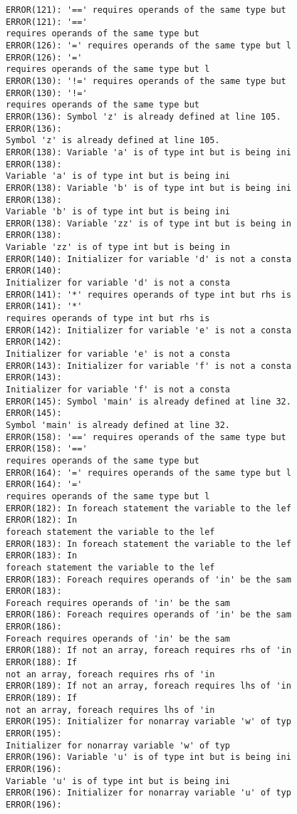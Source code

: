 \documentclass[12pt]{book}
\begin{document}
\begin{lstlisting}
ERROR(121): '==' requires operands of the same type but     ERROR(121): '=='
requires operands of the same type but 
ERROR(126): '=' requires operands of the same type but l    ERROR(126): '=' 
requires operands of the same type but l
ERROR(130): '!=' requires operands of the same type but     ERROR(130): '!='
requires operands of the same type but 
ERROR(136): Symbol 'z' is already defined at line 105.        ERROR(136): 
Symbol 'z' is already defined at line 105.
ERROR(138): Variable 'a' is of type int but is being ini    ERROR(138): 
Variable 'a' is of type int but is being ini
ERROR(138): Variable 'b' is of type int but is being ini    ERROR(138): 
Variable 'b' is of type int but is being ini
ERROR(138): Variable 'zz' is of type int but is being in    ERROR(138): 
Variable 'zz' is of type int but is being in
ERROR(140): Initializer for variable 'd' is not a consta    ERROR(140): 
Initializer for variable 'd' is not a consta
ERROR(141): '*' requires operands of type int but rhs is    ERROR(141): '*' 
requires operands of type int but rhs is
ERROR(142): Initializer for variable 'e' is not a consta    ERROR(142): 
Initializer for variable 'e' is not a consta
ERROR(143): Initializer for variable 'f' is not a consta    ERROR(143): 
Initializer for variable 'f' is not a consta
ERROR(145): Symbol 'main' is already defined at line 32.    ERROR(145): 
Symbol 'main' is already defined at line 32.
ERROR(158): '==' requires operands of the same type but     ERROR(158): '=='
requires operands of the same type but 
ERROR(164): '=' requires operands of the same type but l    ERROR(164): '=' 
requires operands of the same type but l
ERROR(182): In foreach statement the variable to the lef    ERROR(182): In 
foreach statement the variable to the lef
ERROR(183): In foreach statement the variable to the lef    ERROR(183): In 
foreach statement the variable to the lef
ERROR(183): Foreach requires operands of 'in' be the sam    ERROR(183): 
Foreach requires operands of 'in' be the sam
ERROR(186): Foreach requires operands of 'in' be the sam    ERROR(186): 
Foreach requires operands of 'in' be the sam
ERROR(188): If not an array, foreach requires rhs of 'in    ERROR(188): If 
not an array, foreach requires rhs of 'in
ERROR(189): If not an array, foreach requires lhs of 'in    ERROR(189): If 
not an array, foreach requires lhs of 'in
ERROR(195): Initializer for nonarray variable 'w' of typ    ERROR(195): 
Initializer for nonarray variable 'w' of typ
ERROR(196): Variable 'u' is of type int but is being ini    ERROR(196): 
Variable 'u' is of type int but is being ini
ERROR(196): Initializer for nonarray variable 'u' of typ    ERROR(196): 

\end{lstlisting}
\end{document}
